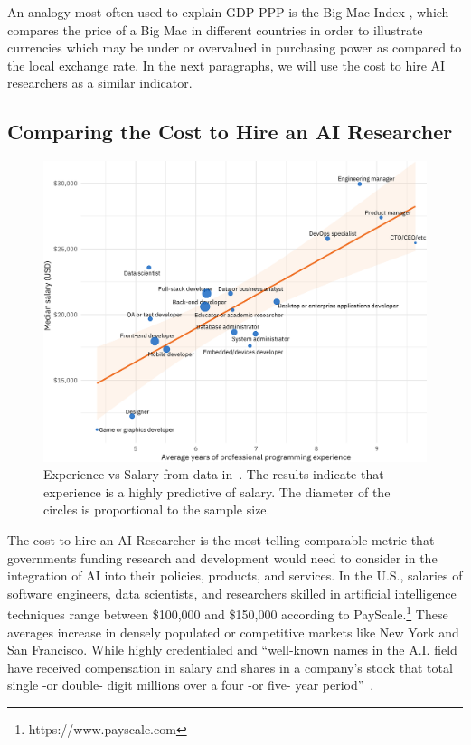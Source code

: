 \documentclass[conference]{IEEEtran}
\begin{document}
An analogy most often used to explain GDP-PPP is the Big Mac Index \cite{o2017adjusted}, which compares the price of a Big Mac in different countries in order to illustrate currencies which may be under or overvalued in purchasing power as compared to the local exchange rate. In the next paragraphs, we will use the cost to hire AI researchers as a similar indicator.


\subsection{Comparing the Cost to Hire an AI Researcher}

\begin{figure}[!t]
\centering
\includegraphics[width=\columnwidth]{aisalary}
\caption{Experience vs Salary from data  in~\cite{silge2018hiring}. The results indicate that experience is a highly predictive of salary. The diameter of the circles is proportional to the sample size.}
\label{fig:salary}
\end{figure}


The cost to hire an AI Researcher is the most telling comparable metric that governments funding research and development would need to consider in the integration of AI into their policies, products, and services. In the U.S., salaries of software engineers, data scientists, and researchers skilled in artificial intelligence techniques range between \$100,000 and \$150,000 according to PayScale.\footnote{https://www.payscale.com} These averages increase in densely populated or competitive markets like New York and San Francisco. While highly credentialed and ``well-known names in the A.I. field have received compensation in salary and shares in a company's stock that total single -or double- digit millions over a four -or five- year period''~\cite{metz2017tech}.
\end{document}
